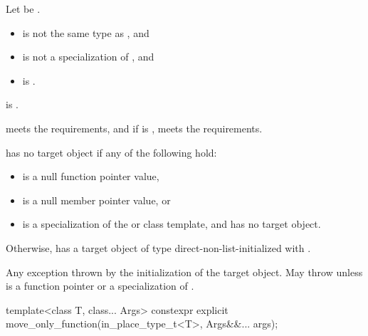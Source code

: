 \begin{itemdescr}
\pnum
Let  be .

\pnum
\constraints
\begin{itemize}
\item {} is not the same type as , and
\item {} is not a specialization of , and
\item {} is .
\end{itemize}

\pnum
\mandates
{} is .

\pnum
\expects
{} meets the  requirements, and if  is ,  meets the  requirements.

\pnum
\ensures
{} has no target object if any of the following hold:
\begin{itemize}
\item {} is a null function pointer value,
\item {} is a null member pointer value, or
\item {} is a specialization of the  or  class template, and  has no target object.
\end{itemize}
Otherwise,  has a target object of type  direct-non-list-initialized with .

\pnum
\throws
Any exception thrown by the initialization of the target object. May throw  unless  is a function pointer or a specialization of .
\end{itemdescr}

%
\begin{itemdecl}
template<class T, class... Args>
  constexpr explicit move_only_function(in_place_type_t<T>, Args&&... args);
\end{itemdecl}

